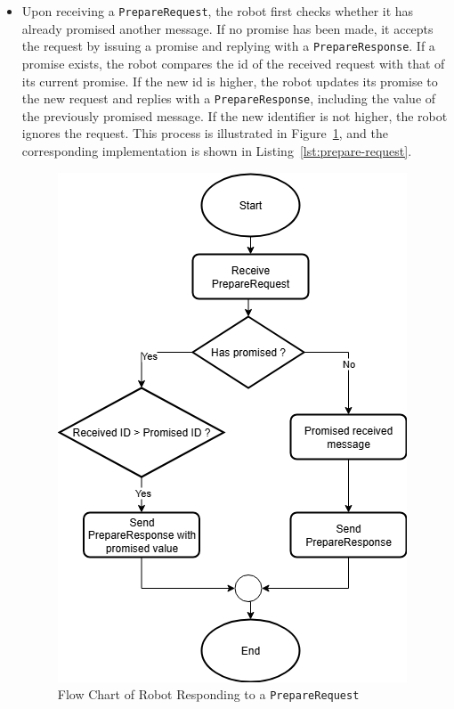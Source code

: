 \documentclass[12pt,a4paper]{article}
\begin{document}
\begin{itemize}


\item Upon receiving a \texttt{PrepareRequest}, the robot first checks whether it has already promised another message. If no promise has been made, it accepts the request by issuing a promise and replying with a \texttt{PrepareResponse}. If a promise exists, the robot compares the id of the received request with that of its current promise. If the new id is higher, the robot updates its promise to the new request and replies with a \texttt{PrepareResponse}, including the value of the previously promised message. If the new identifier is not higher, the robot ignores the request. This process is illustrated in Figure~\ref{fig:prepare-request}, and the corresponding implementation is shown in Listing~\ref{lst:prepare-request}.

\begin{figure}
    \centering
    \includegraphics[width=0.5\linewidth]{images/prepare_request.png}
    \caption{Flow Chart of Robot Responding to a \texttt{PrepareRequest}}   
    \label{fig:prepare-request}
\end{figure}


\end{itemize}
\end{document}
